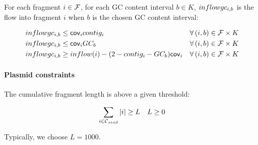 For each fragment \(i \in \mathcal{F}{}\), for each GC content interval \(b \in K\), \(inflowgc_{i, b}\) is the flow into fragment \(i\) when \(b\) is the chosen GC content interval:
\begin{Constraint}
  \begin{align}
    \inflowgc{i}{b} & \leq \cov{i} \contig{i} & \forall (i, b) \in \Fragments{} \times K \label{pbf_iterbin:milp:cst:gc:inflowgc_1}  \\ %
    \inflowgc{i}{b} & \leq \cov{i} GC_b & \forall (i, b) \in \Fragments{} \times K \label{pbf_iterbin:milp:cst:gc:inflowgc_2}  \\ %
    \inflowgc{i}{b} & \geq inflow(i)  - (2 - \contig{i} - GC_b) \cov{i} & \forall (i, b) \in \Fragments{} \times K \label{pbf_iterbin:milp:cst:gc:inflowgc_3} %
  \end{align}
\end{Constraint}

\paragraph{Plasmid constraints}

The cumulative fragment length is above a given threshold:
%
\begin{Constraint}
  \begin{equation}
    \sum_{i \in \ContigSeeds{}} |i| \geq L \quad L \geq 0 \label{pbf_iterbin:milp:cst:misc:min_cumulative_fragment_length} %
  \end{equation}
\end{Constraint}
%
Typically, we choose \(L = 1000\).